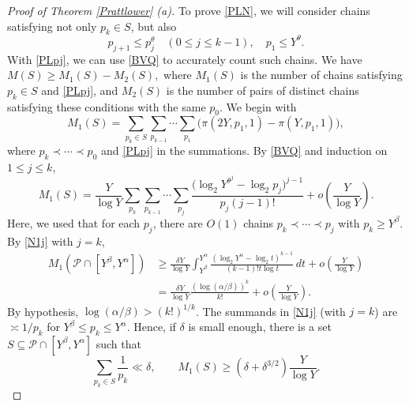 \documentclass[12pt]{amsart}
\theoremstyle{remark}
\theoremstyle{plain}
\numberwithin{equation}{section}
\newcommand{\be}{\begin{equation}}
\newcommand{\ee}{\end{equation}}
\renewcommand{\th}{\ensuremath{\theta}}
\renewcommand{\a}{\ensuremath{\alpha}}
\renewcommand{\b}{\ensuremath{\beta}}
\newcommand{\del}{\ensuremath{\delta}}
\renewcommand{\(}{\left(}
\renewcommand{\)}{\right)}
\newcommand{\pfrac}[2]{\left(\frac{#1}{#2}\right)}
\renewcommand{\le}{\leqslant}
\renewcommand{\ge}{\geqslant}
\begin{document}
\begin{proof}[Proof of Theorem \ref{Prattlower} (a)]
To prove \eqref{PLN}, we will consider chains satisfying
not only $p_k\in S$, but also
\be\label{PLpj}
p_{j+1} \le p_j^\th \quad (0\le j\le k-1), \quad p_1 \le Y^{\th}.
\ee
With \eqref{PLpj}, we can use \eqref{BVQ} to accurately count such chains.
We have $M(S) \ge M_1(S) - M_2(S),$
where $M_1(S)$ is the number of chains satisfying
$p_k \in S$ and \eqref{PLpj}, and $M_2(S)$ is the number of
pairs of distinct chains satisfying these conditions with the same
$p_0$.  We begin with
\[
M_1(S) = \sum_{p_k\in S} \sum_{p_{k-1}} \cdots \sum_{p_1} \biggl(
\pi(2Y,p_1,1)-\pi(Y,p_1,1) \biggr),
\]
where $p_k\prec \cdots \prec p_0$ and \eqref{PLpj} in the summations.
By  \eqref{BVQ} and induction on $1\le j\le k$,
\be\label{N1j}
M_1(S) =
\frac{Y}{\log Y} \sum_{p_k} \sum_{p_{k-1}} \cdots \sum_{p_j} \frac{\big(\log_2
  Y^{\th^j} - \log_2 p_j \big)^{j-1}}{p_j (j-1)!} + o\pfrac{Y}{\log Y}.
\ee
Here, we used that for each $p_j$, there are $O(1)$ chains
 $p_{k} \prec \cdots \prec p_j$ with $p_k \ge Y^{\b}$.
By \eqref{N1j} with $j=k$,
\begin{align*}
M_1(\mathcal{P} \cap [Y^{\b},Y^{\a}]) &\ge 
\frac{\del Y}{\log Y}
 \int_{Y^\b}^{Y^{\a}} \frac{\( \log_2 Y^{\a}-\log_2 t
  \)^{k-1}}{(k-1)! t\log t}\, dt + o\pfrac{Y}{\log Y} \\
&= \frac{\del Y}{\log Y} \frac{(\log (\a/\b))^k}{k!} + o\pfrac{Y}{\log Y}.
\end{align*}
By hypothesis, $\log(\a/\b) > (k!)^{1/k}$.  The summands
in \eqref{N1j} (with $j=k$) are $\asymp 1/p_k$ for $Y^\b \le p_k \le
Y^\a$.  Hence,
if $\del$ is small enough, there is a set $S\subseteq \mathcal{P} \cap
[Y^\b,Y^\a]$ such that
\be\label{N1lower}
\sum_{p_k\in S} \frac{1}{p_k} \ll \del, \qquad
M_1(S) \ge \( \del + \del^{3/2} \) \frac{Y}{\log Y}.
\ee


\end{proof}
\end{document}
